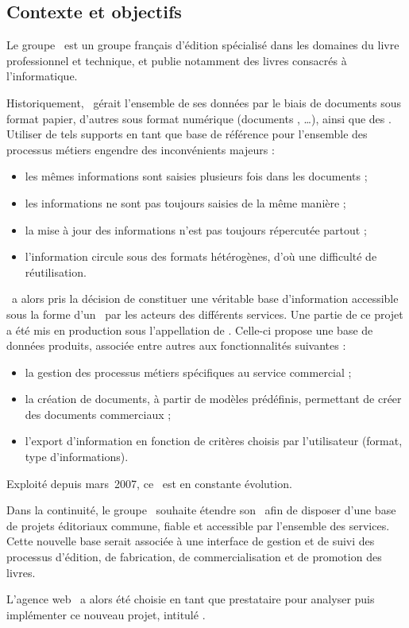 \subsection{Contexte et objectifs}
\label{section:eyrolles_contexte}

Le groupe \aey\ est un groupe français d'édition spécialisé dans les domaines du livre professionnel et technique, et publie notamment des livres consacrés à l'informatique.

Historiquement, \aey\ gérait l'ensemble de ses données par le biais de documents sous format papier, d'autres sous format numérique (documents \amsword, \amsexcel\dots), ainsi que des \aemails. Utiliser de tels supports en tant que base de référence pour l'ensemble des processus métiers engendre des inconvénients majeurs :

\begin{itemize}
	\item les mêmes informations sont saisies plusieurs fois dans les documents ;
	\item les informations ne sont pas toujours saisies de la même manière ;
	\item la mise à jour des informations n'est pas toujours répercutée partout ;
	\item l'information circule sous des formats hétérogènes, d'où une difficulté de réutilisation.
\end{itemize}

\aey\ a alors pris la décision de constituer une véritable base d'information accessible sous la forme d'un \aintranet\ par les acteurs des différents services. Une partie de ce projet a été mis en production sous l'appellation de \emph{\alotun}. Celle-ci propose une base de données produits, associée entre autres aux fonctionnalités suivantes :

\begin{itemize}
	\item la gestion des processus métiers spécifiques au service commercial ;
	\item la création de documents, à partir de modèles prédéfinis, permettant de créer des documents commerciaux ;
	\item l'export d'information en fonction de critères choisis par l'utilisateur (format, type d'informations).
\end{itemize}

Exploité depuis mars~2007, ce \alotun\ est en constante évolution.

Dans la continuité, le groupe \aey\ souhaite étendre son \aintranet\ afin de disposer d'une base de projets éditoriaux commune, fiable et accessible par l'ensemble des services. Cette nouvelle base serait associée à une interface de gestion et de suivi des processus d'édition, de fabrication, de commercialisation et de promotion des livres.

L'agence web \asl\ a alors été choisie en tant que prestataire pour analyser puis implémenter ce nouveau projet, intitulé \emph{\alotdeux}.
